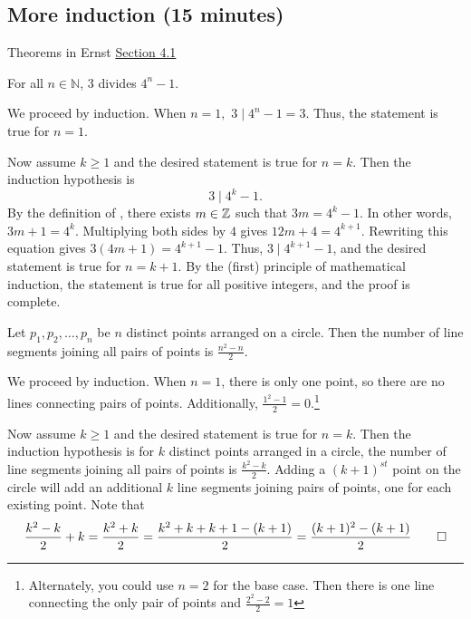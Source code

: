 \documentclass{ximera}
\begin{document}
\subsection{More induction (15 minutes)}


\begin{br}
Theorems in Ernst \href{https://danaernst.com/IBL-IntroToProof/pretext/sec_Intro_to_Induction.html}{Section 4.1} 
 

\begin{thm*}
For all $n\in\mathbb{N}$, 3 divides $4^{n}-1$.
\end{thm*}
\begin{solution}
We proceed by induction.  When $n=1,$ $3\mid 4^n-1=3$. Thus, the statement is true for $n=1.$

Now assume $k\geq 1$ and the desired statement is true for $n=k$. Then the induction hypothesis is \[3\mid 4^k-1.\]
By the definition of , there exists $m\in\mathbb Z$ such that $3m=4^k-1.$ In other words, $3m+1=4^k$. Multiplying both sides by $4$ gives $12m+4=4^{k+1}$. Rewriting this equation gives $3(4m+1)=4^{k+1}-1$. Thus, $3\mid 4^{k+1}-1$, and the desired statement is true for $n=k+1$. By the (first) principle of mathematical induction, the statement is true for all positive integers, and the proof is complete.
\end{solution}

 \begin{thm*}
 Let $p_{1}, p_{2}, \ldots, p_{n}$ be $n$ distinct points arranged on a circle.  Then the number of line segments joining all pairs of points is $\frac{n^{2}-n}{2}$.
 \end{thm*}
\begin{solution}
 We proceed by induction. When $n=1$, there is only one point, so there are no lines connecting pairs of points. Additionally, $\frac{1^2-1}{2}=0$.\footnote{Alternately, you could use $n=2$ for the base case. Then there is one line connecting the only pair of points and $\frac{2^2-2}{2}=1$}
 
 Now assume $k\geq 1$ and the desired statement is true for $n=k$. Then the induction hypothesis is for $k$ distinct points arranged in a circle, the number of line segments joining all pairs of points is $\frac{k^{2}-k}{2}$. Adding a $(k+1)^{st}$ point on the circle will add an additional $k$ line segments joining pairs of points, one for each existing point. Note that 
 \[ 
 	\frac{k^{2}-k}{2}+k=\frac{k^{2}+k}{2}=
	\frac{k^2+k+k+1-(k+1)}{2}=\frac{(k+1)^{2}-(k+1)}{2}\qedhere
 \]
\end{solution}
\end{br}
\end{document}
